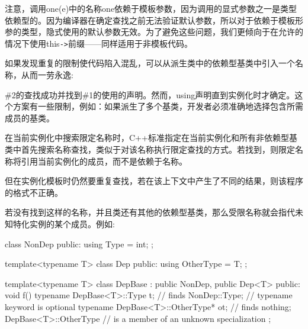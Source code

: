 注意，调用one(e)中的名称one依赖于模板参数，因为调用的显式参数之一是类型依赖型的。因为编译器在确定查找之前无法验证默认参数，所以对于依赖于模板形参的类型，隐式使用的默认参数无效。为了避免这些问题，我们更倾向于在允许的情况下使用this\texttt{->}前缀——同样适用于非模板代码。

如果发现重复的限制使代码陷入混乱，可以从派生类中的依赖型基类中引入一个名称，从而一劳永逸:


\#2的查找成功并找到\#1的使用的声明。然而，using声明直到实例化时才确定。这个方案有一些限制，例如：如果派生了多个基类，开发者必须准确地选择包含所需成员的基类。

在当前实例化中搜索限定名称时，C++标准指定在当前实例化和所有非依赖型基类中首先搜索名称查找，类似于对该名称执行限定查找的方式。若找到，则限定名称将引用当前实例化的成员，而不是依赖于名称。

\begin{notice}但在实例化模板时仍然要重复查找，若在该上下文中产生了不同的结果，则该程序的格式不正确。
\end{notice}

若没有找到这样的名称，并且类还有其他的依赖型基类，那么受限名称就会指代未知特化实例的某个成员。例如:

\begin{cpp}
class NonDep {
	public:
	using Type = int;
};

template<typename T>
class Dep {
	public:
	using OtherType = T;
};

template<typename T>
class DepBase : public NonDep, public Dep<T> {
	public:
	void f() {
		typename DepBase<T>::Type t; // finds NonDep::Type;
		// typename keyword is optional
		typename DepBase<T>::OtherType* ot; // finds nothing; DepBase<T>::OtherType
		// is a member of an unknown specialization
	}
};
\end{cpp}























